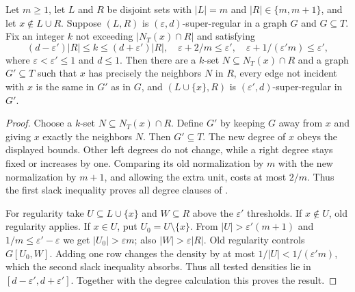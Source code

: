 \begin{lemma}
Let $m\geq1$, let $L$ and $R$ be disjoint sets with $|L|=m$ and
$|R|\in\{m,m+1\}$, and let $x\notin L\cup R$. Suppose $(L,R)$ is
$(\varepsilon,d)$-super-regular in a graph $G$ and $G\subseteq T$. Fix an
integer $k$ not exceeding $|N_T(x)\cap R|$ and satisfying
\[
 (d-\varepsilon')|R|\leq k\leq(d+\varepsilon')|R|,
 \quad \varepsilon+2/m\leq\varepsilon',\quad
 \varepsilon+1/(\varepsilon'm)\leq\varepsilon',
\]
where $\varepsilon<\varepsilon'\leq1$ and $d\leq1$. Then there are a $k$-set
$N\subseteq N_T(x)\cap R$ and a graph $G'\subseteq T$ such that $x$ has
precisely the neighbors $N$ in $R$, every edge not incident with $x$ is the
same in $G'$ as in $G$, and $(L\cup\{x\},R)$ is
$(\varepsilon',d)$-super-regular in $G'$.
\end{lemma}
\begin{proof}
Choose a $k$-set $N\subseteq N_T(x)\cap R$. Define $G'$ by keeping $G$ away
from $x$ and giving $x$ exactly the neighbors $N$. Then $G'\subseteq T$.
The new degree of $x$ obeys the displayed bounds. Other left degrees do not
change, while a right degree stays fixed or increases by one. Comparing its
old normalization by $m$ with the new normalization by $m+1$, and allowing
the extra unit, costs at most $2/m$. Thus the first slack inequality proves
all degree clauses of .

For regularity take $U\subseteq L\cup\{x\}$ and $W\subseteq R$ above the
$\varepsilon'$ thresholds. If $x\notin U$, old regularity applies. If
$x\in U$, put $U_0=U\setminus\{x\}$. From
$|U|>\varepsilon'(m+1)$ and $1/m\leq\varepsilon'-\varepsilon$ we get
$|U_0|>\varepsilon m$; also $|W|>\varepsilon|R|$. Old regularity controls
$G[U_0,W]$. Adding one row changes the density by at most
$1/|U|<1/(\varepsilon'm)$, which the second slack inequality absorbs.
Thus all tested densities lie in $[d-\varepsilon',d+\varepsilon']$.
Together with the degree calculation this proves the result.
\end{proof}

